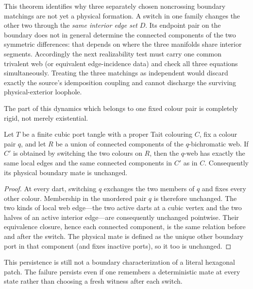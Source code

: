 This theorem identifies why three separately chosen noncrossing boundary
matchings are not yet a physical formation.  A switch in one family changes
the other two through the \emph{same interior edge set} $D$.  Its endpoint
pair on the boundary does not in general determine the connected components
of the two symmetric differences: that depends on where the three manifolds
share interior segments.  Accordingly the next realizability test must carry
one common trivalent web (or equivalent edge-incidence data) and check all
three equations simultaneously.  Treating the three matchings as independent
would discard exactly the source's idemposition coupling and cannot discharge
the surviving physical-exterior loophole.

The part of this dynamics which belongs to one fixed colour pair is completely
rigid, not merely existential.

\begin{theorem}
\label{thm:same-family-physical-kempe-persistence}
Let $T$ be a finite cubic port tangle with a proper Tait colouring $C$, fix a
colour pair $q$, and let $R$ be a union of connected components of the
$q$-bichromatic web.  If $C'$ is obtained by switching the two colours on
$R$, then the $q$-web has exactly the same local edges and the same connected
components in $C'$ as in $C$.  Consequently its physical boundary mate is
unchanged.
\end{theorem}

\begin{proof}
At every dart, switching $q$ exchanges the two members of $q$ and fixes every
other colour.  Membership in the unordered pair $q$ is therefore unchanged.
The two kinds of local web edge---the two active darts at a cubic vertex and
the two halves of an active interior edge---are consequently unchanged
pointwise.  Their equivalence closure, hence each connected component, is the
same relation before and after the switch.  The physical mate is defined as
the unique other boundary port in that component (and fixes inactive ports),
so it too is unchanged.
\end{proof}

This persistence is still not a boundary characterization of a literal
hexagonal patch.  The failure persists even if one remembers a deterministic
mate at every state rather than choosing a fresh witness after each switch.

